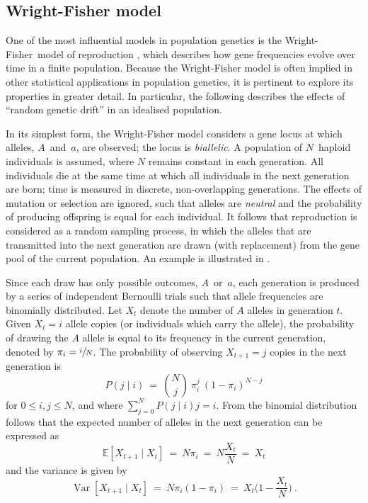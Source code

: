 %
\subsection{Wright-Fisher model}
%

One of the most influential models in population genetics is the Wright-Fisher~model of reproduction \citep{Fisher1930,Wright1931}, which describes how gene frequencies evolve over time in a finite population.
Because the Wright-Fisher model is often implied in other statistical applications in population genetics, it is pertinent to explore its properties in greater detail.
In particular, the following describes the effects of ``random genetic drift'' in an idealised population.

%

%

In its simplest form, the Wright-Fisher model considers a gene locus at which  alleles, $A$~and~$a$, are observed; \ie the locus is \emph{biallelic}.
A population of $N$~haploid individuals is assumed, where $N$ remains constant in each generation.
All individuals die at the same time at which all individuals in the next generation are born; \ie time is measured in discrete, non-overlapping generations.
The effects of mutation or selection are ignored, such that alleles are \emph{neutral} and the probability of producing offspring is equal for each individual.
It follows that reproduction is considered as a random sampling process, in which the alleles that are transmitted into the next generation are drawn (with replacement) from the gene pool of the current population.
An example is illustrated in .

Since each draw has only  possible outcomes, $A$~or~$a$, each generation is produced by a series of independent Bernoulli trials such that allele frequencies are binomially distributed.
Let $X_t$ denote the number of $A$ alleles in generation $t$.
Given ${X_t=i}$ allele copies (or individuals which carry the allele),
the probability of drawing the $A$ allele is equal to its frequency in the current generation, denoted by ${\pi_i = \sfrac{i}{N}}$.
The probability of observing ${X_{t+1}=j}$ copies in the next generation is
\begin{equation}\label{eq:WFprob}
	P(j \mid i) ~=~ {{N}\choose{j}} ~ \pi_i^j ~ (1 - \pi_i)^{N-j}
\end{equation}
for ${0 \leq i,j \leq N}$, and where ${\sum_{j=0}^{N} P(j \mid i) j = i}$.
From the binomial distribution follows that the expected number of alleles in the next generation can be expressed as
\begin{equation}\label{eq:WFexp}
	\mathbb{E}[X_{t+1} \mid X_{t}] ~=~ N \pi_i ~=~ N \frac{X_t}{N} ~=~ X_t
\end{equation}
and the variance is given by
\begin{equation}\label{eq:WFvar}
	\operatorname{Var}[X_{t+1} \mid X_{t}] ~=~ N \pi_i (1 - \pi_i) ~=~ X_t \Big( 1 - \frac{X_t}{N} \Big)
	\ \text{.}
\end{equation}

